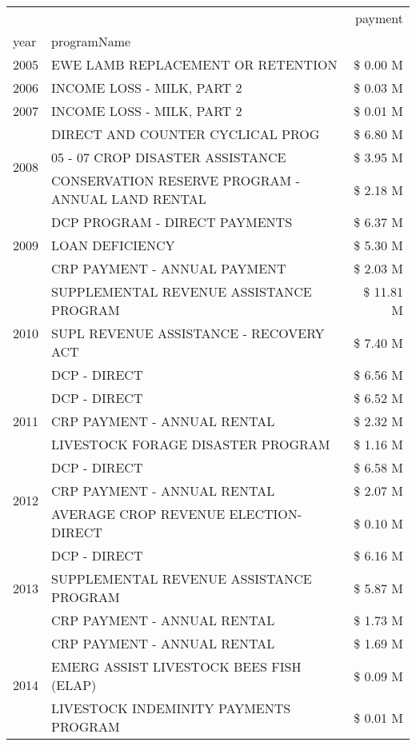 \begin{tabular}{llr}
\toprule
 &  & payment \\
year & programName &  \\
\midrule
2005 & EWE LAMB REPLACEMENT OR RETENTION & \$ 0.00 M \\
\cline{1-3}
2006 & INCOME LOSS - MILK, PART 2 & \$ 0.03 M \\
\cline{1-3}
2007 & INCOME LOSS - MILK, PART 2 & \$ 0.01 M \\
\cline{1-3}
\multirow[t]{3}{*}{2008} & DIRECT AND COUNTER CYCLICAL PROG & \$ 6.80 M \\
 & 05 - 07 CROP DISASTER ASSISTANCE & \$ 3.95 M \\
 & CONSERVATION RESERVE PROGRAM - ANNUAL LAND RENTAL & \$ 2.18 M \\
\cline{1-3}
\multirow[t]{3}{*}{2009} & DCP PROGRAM - DIRECT PAYMENTS & \$ 6.37 M \\
 & LOAN DEFICIENCY & \$ 5.30 M \\
 & CRP PAYMENT - ANNUAL PAYMENT & \$ 2.03 M \\
\cline{1-3}
\multirow[t]{3}{*}{2010} & SUPPLEMENTAL REVENUE ASSISTANCE PROGRAM & \$ 11.81 M \\
 & SUPL REVENUE ASSISTANCE - RECOVERY ACT & \$ 7.40 M \\
 & DCP - DIRECT & \$ 6.56 M \\
\cline{1-3}
\multirow[t]{3}{*}{2011} & DCP - DIRECT & \$ 6.52 M \\
 & CRP PAYMENT - ANNUAL RENTAL & \$ 2.32 M \\
 & LIVESTOCK FORAGE DISASTER PROGRAM & \$ 1.16 M \\
\cline{1-3}
\multirow[t]{3}{*}{2012} & DCP - DIRECT & \$ 6.58 M \\
 & CRP PAYMENT - ANNUAL RENTAL & \$ 2.07 M \\
 & AVERAGE CROP REVENUE ELECTION-DIRECT & \$ 0.10 M \\
\cline{1-3}
\multirow[t]{3}{*}{2013} & DCP - DIRECT & \$ 6.16 M \\
 & SUPPLEMENTAL REVENUE ASSISTANCE PROGRAM & \$ 5.87 M \\
 & CRP PAYMENT - ANNUAL RENTAL & \$ 1.73 M \\
\cline{1-3}
\multirow[t]{3}{*}{2014} & CRP PAYMENT - ANNUAL RENTAL & \$ 1.69 M \\
 & EMERG ASSIST LIVESTOCK BEES FISH (ELAP) & \$ 0.09 M \\
 & LIVESTOCK INDEMINITY PAYMENTS PROGRAM & \$ 0.01 M \\
\cline{1-3}

\end{tabular}
